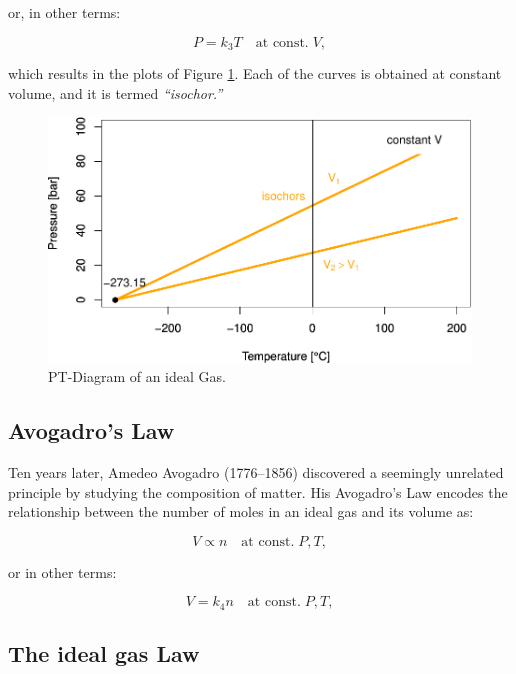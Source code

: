 \documentclass[
  9pt,
]{extbook}
\theoremstyle{definition}
\theoremstyle{definition}
\theoremstyle{definition}
\theoremstyle{remark}
\begin{document}
or, in other terms:

\begin{equation}
P=k_3 T\quad\text{at const.}\;V,
\label{eq:gaylussac2}
\end{equation}

which results in the plots of Figure \ref{fig:FigTPideal}. Each of the curves is obtained at constant volume, and it is termed \emph{``isochor.''}

\begin{figure}

{\centering \includegraphics[width=0.7\linewidth]{pchem1_files/figure-latex/FigTPideal-1} 

}

\caption{PT-Diagram of an ideal Gas.}\label{fig:FigTPideal}
\end{figure}

\hypertarget{avogadros-law}{%
\subsection{Avogadro's Law}\label{avogadros-law}}

Ten years later, Amedeo Avogadro (1776--1856) discovered a seemingly unrelated principle by studying the composition of matter. His Avogadro's Law encodes the relationship between the number of moles in an ideal gas and its volume as:

\begin{equation}
V\propto n\quad\text{at const.}\;P,T,
\label{eq:avogadrolaw1}
\end{equation}

or in other terms:

\begin{equation}
V=k_4 n\quad\text{at const.}\;P,T,
\label{eq:avogadrolaw2}
\end{equation}

\hypertarget{the-ideal-gas-law}{%
\subsection{The ideal gas Law}\label{the-ideal-gas-law}}
\end{document}
